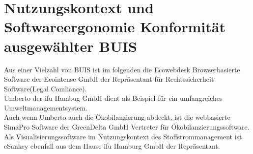 \documentclass[a4paper, 12pt, twoside, BCOR=20mm, DIV=calc, abstracton, parskip=half*, toc=bibliography, toc=listof, headsepline, footsepline, headings=small, numbers=enddot]{scrreprt}
\begin{document}
	\section{Nutzungskontext und Softwareergonomie Konformität ausgewählter BUIS}
	Aus einer Vielzahl von \ac{BUIS} ist im folgenden die Ecowebdesk Browserbasierte Software der Ecointense GmbH der Repräsentant für Rechtssicherheit Software(Legal Comliance). \\
	Umberto der ifu Hambug GmbH dient als Beispiel für ein umfangreiches Umweltmanagementsystem.\\
	Auch wenn Umberto auch die Ökobilanzierung abdeckt, ist die webbasierte SimaPro Software der GreenDelta GmbH Vertreter für Ökobilanzierungssoftware. \\
	Als Visualisierungssoftware im Nutzungskontext des Stoffstrommanagement ist eSankey ebenfall aus dem Hause ifu Hamburg GmbH der Repräsentant. 
%	
%	
%	
%	
%	
\end{document}
